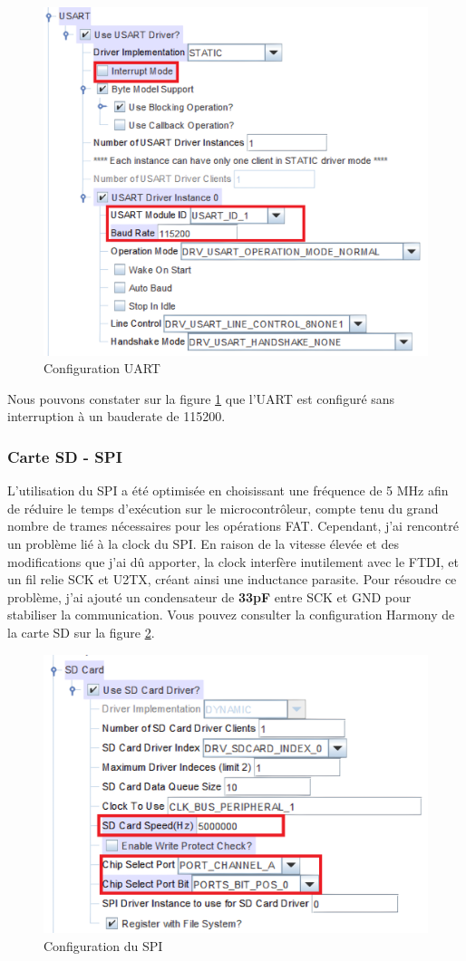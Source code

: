 {	\begin{figure}[h]
		\centering
		\includegraphics[width=0.7\linewidth]{Figures/Dev-SOFT/ConfigUart}
		\caption{Configuration UART}
		\label{fig:configuart}
	\end{figure}
	
	
	Nous pouvons constater sur la figure \ref{fig:configuart} que l'UART est configuré sans interruption à un bauderate de 115200.

	\subsubsection{Carte SD - SPI} 
	{
	L'utilisation du SPI a été optimisée en choisissant une fréquence de 5 MHz afin de réduire le temps d'exécution sur le microcontrôleur, compte tenu du grand nombre de trames nécessaires pour les opérations FAT. Cependant, j'ai rencontré un problème lié à la clock du SPI. En raison de la vitesse élevée et des modifications que j'ai dû apporter, la clock interfère inutilement avec le FTDI, et un fil relie SCK et U2TX, créant ainsi une inductance parasite. Pour résoudre ce problème, j'ai ajouté un condensateur de \textbf{33pF} entre SCK et GND pour stabiliser la communication. Vous pouvez consulter la configuration Harmony de la carte SD sur la figure \ref{fig:configsdspi}.
	\clearpage
	\begin{figure}[h]
		\centering
		\includegraphics[width=0.7\linewidth]{Figures/Dev-SOFT/ConfigSD_SPI}
		\caption{Configuration du SPI}
		\label{fig:configsdspi}
	\end{figure}
	}

}
